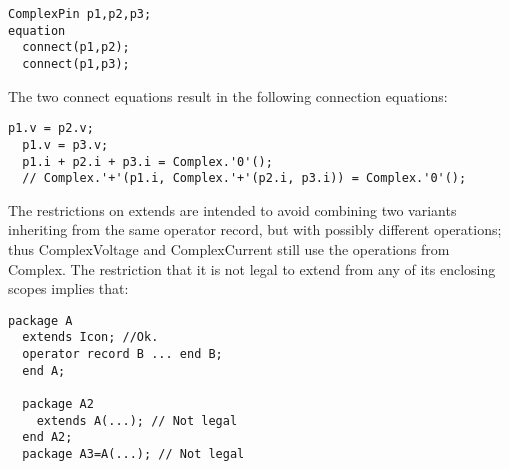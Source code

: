 \begin{example}
\begin{lstlisting}[language=modelica]
  ComplexPin p1,p2,p3;
equation
  connect(p1,p2);
  connect(p1,p3);
\end{lstlisting}
The two connect equations result in the following connection
equations:
\begin{lstlisting}[language=modelica]
  p1.v = p2.v;
  p1.v = p3.v;
  p1.i + p2.i + p3.i = Complex.'0'();
  // Complex.'+'(p1.i, Complex.'+'(p2.i, p3.i)) = Complex.'0'();
\end{lstlisting}
The restrictions on extends are intended to avoid combining two
variants inheriting from the same operator record, but with possibly
different operations; thus ComplexVoltage and ComplexCurrent still use
the operations from Complex. The restriction that it is not legal to
extend from any of its enclosing scopes implies that:
\begin{lstlisting}[language=modelica]
package A
  extends Icon; //Ok.
  operator record B ... end B;
  end A;

  package A2
    extends A(...); // Not legal
  end A2;
  package A3=A(...); // Not legal
\end{lstlisting}
\end{example}
